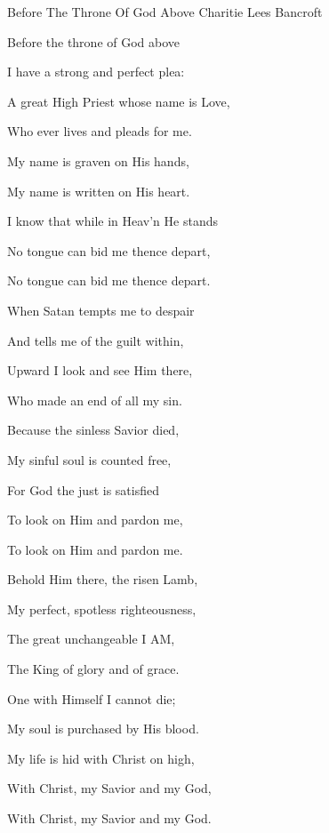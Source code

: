\documentclass[12pt]{book}
\begin{document}
\begin{song}{Before The Throne Of God Above}{}
  {\SBPubDom}
  {Charitie Lees Bancroft}
  {}
  {}

  \begin{SBVerse}
    Before the throne of God above

    I have a strong and perfect plea:

    A great High Priest whose name is Love,

    Who ever lives and pleads for me.

    My name is graven on His hands,

    My name is written on His heart.

    I know that while in Heav'n He stands

    No tongue can bid me thence depart,

    No tongue can bid me thence depart.
  \end{SBVerse}

  \begin{SBVerse}
    When Satan tempts me to despair

    And tells me of the guilt within,

    Upward I look and see Him there,

    Who made an end of all my sin.

    Because the sinless Savior died,

    My sinful soul is counted free,

    For God the just is satisfied

    To look on Him and pardon me,

    To look on Him and pardon me.
  \end{SBVerse}

  \begin{SBVerse}
    Behold Him there, the risen Lamb,

    My perfect, spotless righteousness,

    The great unchangeable I AM,

    The King of glory and of grace.

    One with Himself I cannot die;

    My soul is purchased by His blood.

    My life is hid with Christ on high,

    With Christ, my Savior and my God,

    With Christ, my Savior and my God.
  \end{SBVerse}
\end{song}
\end{document}
